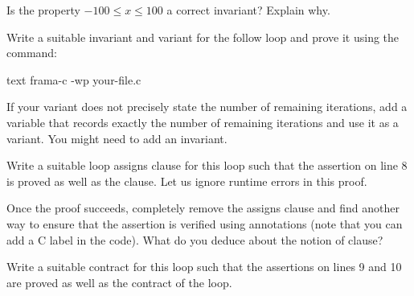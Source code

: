 

Is the property $-100 \leq x \leq 100$ a correct invariant? Explain why.





Write a suitable invariant and variant for the follow loop and prove it
using the command:

\begin{CodeBlock}{text}
frama-c -wp your-file.c
\end{CodeBlock}




If your variant does not precisely state the number of remaining
iterations, add a variable that records exactly the number of remaining
iterations and use it as a variant. You might need to add an invariant.





Write a suitable loop assigns clause for this loop such that the assertion
on line 8 is proved as well as the  clause. Let us ignore
runtime errors in this proof.






Once the proof succeeds, completely remove the assigns clause and find
another way to ensure that the assertion is verified using annotations (note
that you can add a C label in the code). What do you deduce about the notion
of  clause?





Write a suitable contract for this loop such that the assertions on lines
9 and 10 are proved as well as the contract of the loop.


